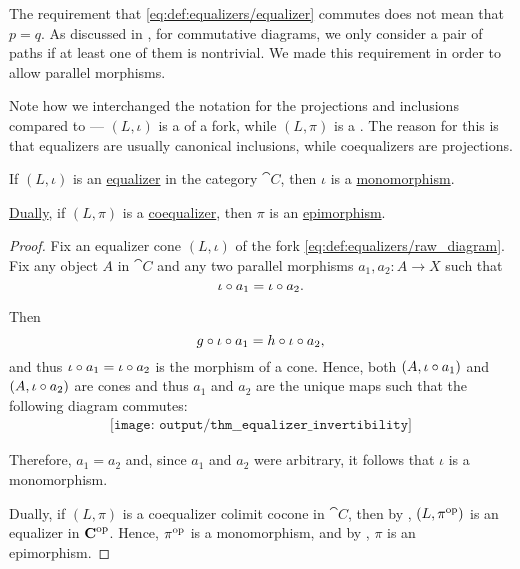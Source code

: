 \begin{definition}
  The requirement that \eqref{eq:def:equalizers/equalizer} commutes does not mean that \( p = q \). As discussed in , for commutative diagrams, we only consider a pair of paths if at least one of them is nontrivial. We made this requirement in order to allow parallel morphisms.

  Note how we interchanged the notation for the projections and inclusions compared to  --- \( (L, \iota) \) is a  of a fork, while \( (L, \pi) \) is a . The reason for this is that equalizers are usually canonical inclusions, while coequalizers are projections.
\end{definition}

\begin{proposition}\label{thm:equalizer_invertibility}
  If \( (L, \iota) \) is an \hyperref[def:equalizers]{equalizer} in the category \( \cat{C} \), then \( \iota \) is a \hyperref[def:morphism_invertibility/left_cancellative]{monomorphism}.

  \hyperref[thm:categorical_principle_of_duality]{Dually}, if \( (L, \pi) \) is a \hyperref[def:equalizers]{coequalizer}, then \( \pi \) is an \hyperref[def:morphism_invertibility/right_cancellative]{epimorphism}.
\end{proposition}
\begin{proof}
  Fix an equalizer cone \( (L, \iota) \) of the fork \eqref{eq:def:equalizers/raw_diagram}. Fix any object \( A \) in \( \cat{C} \) and any two parallel morphisms \( a_1, a_2: A \to X \) such that
  \begin{equation*}
    \iota \bincirc a_1 = \iota \bincirc a_2.
  \end{equation*}

  Then
  \begin{equation*}
    g \bincirc \iota \bincirc a_1 = h \bincirc \iota \bincirc a_2,
  \end{equation*}
  and thus \( \iota \bincirc a_1 = \iota \bincirc a_2 \) is the morphism of a cone. Hence, both \( (A, \iota \bincirc a_1) \) and \( (A, \iota \bincirc a_2) \) are cones and thus \( a_1 \) and \( a_2 \) are the unique maps such that the following diagram commutes:
  \begin{equation}\label{eq:thm:equalizer_invertibility/monomorphism}
    \begin{aligned}
      \texttt{[image: output/thm\_\_equalizer\_invertibility]}
    \end{aligned}
  \end{equation}

  Therefore, \( a_1 = a_2 \) and, since \( a_1 \) and \( a_2 \) were arbitrary, it follows that \( \iota \) is a monomorphism.

  Dually, if \( (L, \pi) \) is a coequalizer colimit cocone in \( \cat{C} \), then by , \( (L, \pi^{\operatorname{op}}) \) is an equalizer in \( \operatorname{\mathbf{C}}^{\operatorname{op}} \). Hence, \( \pi^{\operatorname{op}} \) is a monomorphism, and by , \( \pi \) is an epimorphism.
\end{proof}

